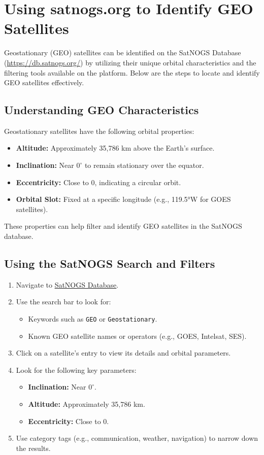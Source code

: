 % 

\section{Using satnogs.org to Identify GEO Satellites}

Geostationary (GEO) satellites can be identified on the SatNOGS Database (\href{https://db.satnogs.org/}{https://db.satnogs.org/}) by utilizing their unique orbital characteristics and the filtering tools available on the platform. Below are the steps to locate and identify GEO satellites effectively.
\subsection{Understanding GEO Characteristics}
Geostationary satellites have the following orbital properties:
\begin{itemize}
    \item \textbf{Altitude:} Approximately 35,786 km above the Earth's surface.
    \item \textbf{Inclination:} Near $0^\circ$ to remain stationary over the equator.
    \item \textbf{Eccentricity:} Close to 0, indicating a circular orbit.
    \item \textbf{Orbital Slot:} Fixed at a specific longitude (e.g., 119.5°W for GOES satellites).
\end{itemize}

These properties can help filter and identify GEO satellites in the SatNOGS database.

\subsection{Using the SatNOGS Search and Filters}
\begin{enumerate}
    \item Navigate to \href{https://db.satnogs.org/}{SatNOGS Database}.
    \item Use the search bar to look for:
    \begin{itemize}
        \item Keywords such as \texttt{GEO} or \texttt{Geostationary}.
        \item Known GEO satellite names or operators (e.g., GOES, Intelsat, SES).
    \end{itemize}
    \item Click on a satellite’s entry to view its details and orbital parameters.
    \item Look for the following key parameters:
    \begin{itemize}
        \item \textbf{Inclination:} Near $0^\circ$.
        \item \textbf{Altitude:} Approximately 35,786 km.
        \item \textbf{Eccentricity:} Close to 0.
    \end{itemize}
    \item Use category tags (e.g., communication, weather, navigation) to narrow down the results.
\end{enumerate}

